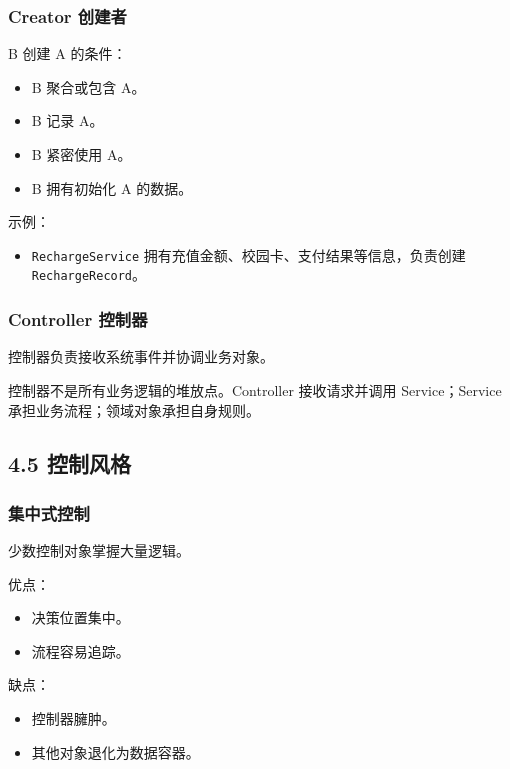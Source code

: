 \documentclass[UTF8,zihao=-4]{ctexart}
\begin{document}
\subsubsection{Creator 创建者}

B 创建 A 的条件：

\begin{itemize}
\item B 聚合或包含 A。
\item B 记录 A。
\item B 紧密使用 A。
\item B 拥有初始化 A 的数据。
\end{itemize}

示例：

\begin{itemize}
\item \texttt{RechargeService} 拥有充值金额、校园卡、支付结果等信息，负责创建 \texttt{RechargeRecord}。
\end{itemize}

\subsubsection{Controller 控制器}

控制器负责接收系统事件并协调业务对象。

控制器不是所有业务逻辑的堆放点。Controller 接收请求并调用 Service；Service 承担业务流程；领域对象承担自身规则。

\subsection{4.5 控制风格}

\subsubsection{集中式控制}

少数控制对象掌握大量逻辑。

优点：

\begin{itemize}
\item 决策位置集中。
\item 流程容易追踪。
\end{itemize}

缺点：

\begin{itemize}
\item 控制器臃肿。
\item 其他对象退化为数据容器。
\end{itemize}
\end{document}

